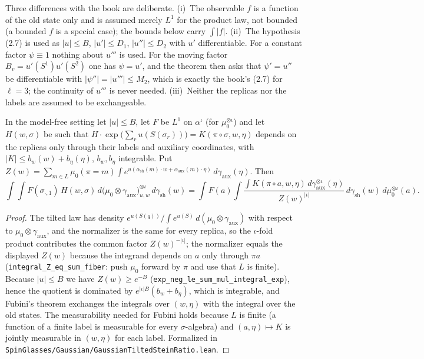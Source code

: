 \begin{remark}
Three differences with the book are deliberate. (i)~The observable $f$ is a function of the old state only and is assumed merely $L^1$ for the product law, not bounded
(a bounded $f$ is a special case); the bounds below carry $\int|f|$. (ii)~The hypothesis (2.7) is used as $|u|\le B$, $|u'|\le D_1$, $|u''|\le D_2$ with $u'$ differentiable. For a constant factor $\psi\equiv1$ nothing about $u'''$ is used. For the moving factor $B_v=u'(S^1)u'(S^2)$ one has $\psi=u'$, and the theorem then asks that $\psi'=u''$ be differentiable with $|\psi''|=|u'''|\le M_2$, which is exactly the book's (2.7) for $\ell=3$; the continuity of $u'''$ is never needed.
(iii)~Neither the replicas nor the labels are assumed to be exchangeable.
\end{remark}

\begin{lemma}\label{lem:sg-tal:perceptron-tilted-fubini}
  \leanok
In the model-free setting let $|u|\le B$, let $F$ be $L^1$ on $\alpha^\iota$ (for $\mu_0^{\otimes\iota}$) and let $H(w,\sigma)$ be such that $H\cdot\exp\bigl(\sum_ru(S(\sigma_r))\bigr)=K(\pi\circ\sigma,w,\eta)$ depends on the replicas only through
their labels and auxiliary coordinates, with $|K|\le b_w(w)+b_\eta(\eta)$, $b_w,b_\eta$ integrable. Put
$Z(w)=\sum_{m\in L}\mu_0(\pi=m)\int e^{u(\alpha_{\mathrm{sh}}(m)\cdot w+\alpha_{\mathrm{aux}}(m)\cdot\eta)}\,d\gamma_{\mathrm{aux}}(\eta)$. Then
\[
 \int\!\!\int F(\sigma_{\cdot,1})\,H(w,\sigma)\,d\bigl(\mu_0\otimes\gamma_{\mathrm{aux}}\bigr)_{u,w}^{\otimes\iota}\,d\gamma_{\mathrm{sh}}(w)
 =\int F(a)\int\frac{\int K(\pi\circ a,w,\eta)\,d\gamma_{\mathrm{aux}}^{\otimes\iota}(\eta)}{Z(w)^{|\iota|}}\,d\gamma_{\mathrm{sh}}(w)\,d\mu_0^{\otimes\iota}(a).
\]
\end{lemma}
\begin{proof}
  \leanok
The tilted law has density $e^{u(S(q))}/\int e^{u(S)}\,d(\mu_0\otimes\gamma_{\mathrm{aux}})$ with respect to $\mu_0\otimes\gamma_{\mathrm{aux}}$, and the normalizer is the same for every replica,
so the $\iota$-fold product contributes the common factor $Z(w)^{-|\iota|}$; the normalizer equals the displayed $Z(w)$ because the integrand depends on $a$ only through $\pi a$
(\texttt{integral\_Z\_eq\_sum\_fiber}: push $\mu_0$ forward by $\pi$ and use that $L$ is finite). Because $|u|\le B$ we have $Z(w)\ge e^{-B}$ (\texttt{exp\_neg\_le\_sum\_mul\_integral\_exp}),
hence the quotient is dominated by $e^{|\iota|B}(b_w+b_\eta)$, which is integrable, and Fubini's theorem exchanges the integrals over $(w,\eta)$ with the integral over the old states.
The measurability needed for Fubini holds because $L$ is finite (a function of a finite label is measurable for every $\sigma$-algebra) and $(a,\eta)\mapsto K$ is jointly measurable in $(w,\eta)$ for each label.
Formalized in \texttt{SpinGlasses/Gaussian/GaussianTiltedSteinRatio.lean}.
\end{proof}

